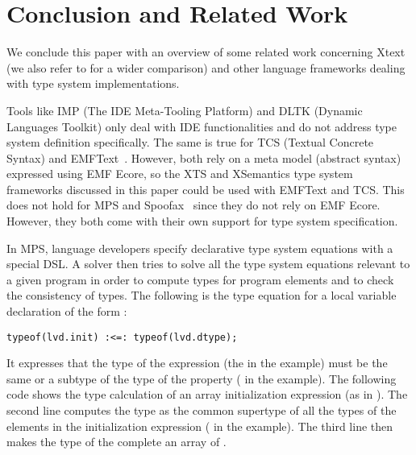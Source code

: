
\section{Conclusion and Related Work}
\label{sec:conclusion}

We conclude this paper with an overview of some related work concerning Xtext
(we also refer to \cite{PP08} for a wider comparison)
and other language frameworks dealing with type system implementations.

\newcommand{\xtypes}{XTypeS}
\newcommand{\xtext}{Xtext}



Tools like IMP (The IDE Meta-Tooling Platform) \cite{imp09} and DLTK (Dynamic
Languages Toolkit) \cite{DLTK} only deal with IDE functionalities and do not
address type system definition specifically. 
The same is true for TCS (Textual Concrete Syntax) \cite{tcs}  
and EMFText~\cite{emftext09}. However, both rely on a meta model (abstract
syntax) expressed using EMF Ecore, so the XTS and XSemantics type system
frameworks discussed in this paper could be used with EMFText and TCS. 
This does not hold for MPS \cite{MPS} and Spoofax~\cite{Spoofax2010}
since they do not rely on EMF Ecore. However, they both come with their own
support for type system specification.

In MPS, language developers specify declarative type system equations with a
special DSL. A solver then tries to solve all the type system equations relevant
to a given program in order to compute types for program elements and to check
the consistency of types. The following is the type equation for a local
variable declaration of the form :

\begin{lstlisting}[language=MPS]
typeof(lvd.init) :<=: typeof(lvd.dtype);
\end{lstlisting}

\noindent
It expresses that the type of the  expression (the  in the
example) must be the same or a subtype of the type of the  property
( in the example). The following code shows the type calculation of an
array initialization expression (as in ). The second line
computes the type  as the common supertype of all the types of the
elements in the initialization expression ( in the example). The third
line then makes the type of the complete  an array of .

